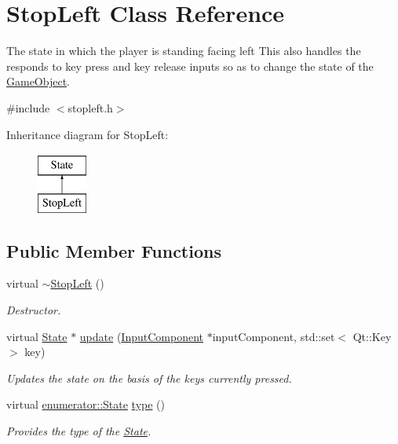 \hypertarget{classStopLeft}{\section{Stop\-Left Class Reference}
\label{classStopLeft}
}


The state in which the player is standing facing left This also handles the responds to key press and key release inputs so as to change the state of the \hyperlink{classGameObject}{Game\-Object}.  




{\ttfamily \#include $<$stopleft.\-h$>$}

Inheritance diagram for Stop\-Left\-:\begin{figure}[H]
\begin{center}
\leavevmode
\includegraphics[height=2.000000cm]{classStopLeft}
\end{center}
\end{figure}
\subsection*{Public Member Functions}
\begin{DoxyCompactItemize}
\item 
\hypertarget{classStopLeft_ae09316bd4da3643256b6b7d464117a58}{virtual \hyperlink{classStopLeft_ae09316bd4da3643256b6b7d464117a58}{$\sim$\-Stop\-Left} ()}\label{classStopLeft_ae09316bd4da3643256b6b7d464117a58}

\begin{DoxyCompactList}\small\item\em Destructor. \end{DoxyCompactList}\item 
virtual \hyperlink{classState}{State} $\ast$ \hyperlink{classStopLeft_ae853fc7d82f2a8d306adc186ab9e52dd}{update} (\hyperlink{classInputComponent}{Input\-Component} $\ast$input\-Component, std\-::set$<$ Qt\-::\-Key $>$ key)
\begin{DoxyCompactList}\small\item\em Updates the state on the basis of the keys currently pressed. \end{DoxyCompactList}\item 
virtual \hyperlink{namespaceenumerator_a5fc7b342c2c633e1037b07cea237a222}{enumerator\-::\-State} \hyperlink{classStopLeft_a715c78b6093aa8624c41582c2435ee69}{type} ()
\begin{DoxyCompactList}\small\item\em Provides the type of the \hyperlink{classState}{State}. \end{DoxyCompactList}\end{DoxyCompactItemize}


